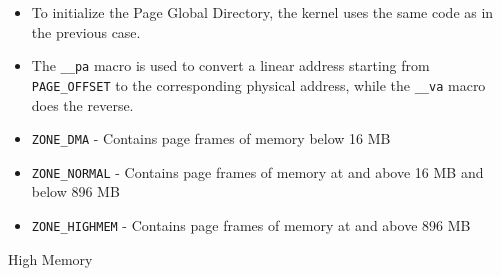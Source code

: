 \begin{itemize}
\item To initialize the Page Global Directory, the kernel uses the same code as in the
  previous case.
\item The \texttt{\_\_pa} macro is used to convert a linear address starting from
  \texttt{PAGE\_OFFSET} to the corresponding physical address, while the \texttt{\_\_va} macro
  does the reverse.
\item \texttt{ZONE\_DMA} - Contains page frames of memory below 16 MB
\item \texttt{ZONE\_NORMAL} - Contains page frames of memory at and above 16 MB and below
  896 MB
\item \texttt{ZONE\_HIGHMEM} - Contains page frames of memory at and above 896 MB
\end{itemize}

\begin{frame}{High Memory}
  \begin{center}
  \end{center}
\end{frame}

